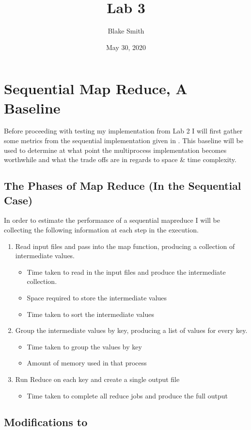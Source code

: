\documentclass[letterpaper,10pt,english,openany,oneside]{sphinxmanual}
\title{Lab 3}
\date{May 30, 2020}
\author{Blake Smith}
\begin{document}
\pagestyle{empty}
\sphinxmaketitle
\pagestyle{plain}
\sphinxtableofcontents
\pagestyle{normal}
\label{\detokenize{index::doc}}



\chapter{Sequential Map Reduce, A Baseline}
\label{\detokenize{lab3report:sequential-map-reduce-a-baseline}}
Before proceeding with testing my implementation from Lab 2
I will first gather some metrics from
the sequential implementation given in .
This baseline will be used to determine at what point the
multi\sphinxhyphen{}process implementation becomes worthwhile and what
the trade offs are in regards to space \& time complexity.


\section{The Phases of Map Reduce (In the Sequential Case)}
\label{\detokenize{lab3report:the-phases-of-map-reduce-in-the-sequential-case}}
In order to estimate the performance of a sequential map\sphinxhyphen{}reduce
I will be collecting the following information at each step
in the execution.
\begin{enumerate}
%
\item {} 
Read input files and pass into the map function, producing
a collection of intermediate values.
\begin{itemize}
\item {} 
Time taken to read in the input files and produce
the intermediate collection.

\item {} 
Space required to store the intermediate values

\item {} 
Time taken to sort the intermediate values

\end{itemize}

\item {} 
Group the intermediate values by key, producing a list of
values for every key.
\begin{itemize}
\item {} 
Time taken to group the values by key

\item {} 
Amount of memory used in that process

\end{itemize}

\item {} 
Run Reduce on each key and create a single output file
\begin{itemize}
\item {} 
Time taken to complete all reduce jobs and produce
the full output

\end{itemize}

\end{enumerate}


\section{Modifications to }
\label{\detokenize{lab3report:modifications-to-mrsequential-go}}


\renewcommand{\indexname}{Index}
\printindex
\end{document}
